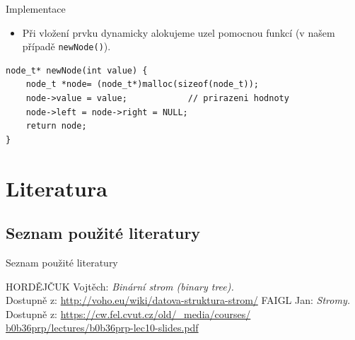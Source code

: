 \documentclass[hyperref={unicode}]{beamer}
\begin{document}
\begin{frame}[fragile]{Implementace}
\begin{itemize}
    \item Při vložení prvku dynamicky alokujeme uzel pomocnou funkcí
    (v našem případě \verb|newNode()|).
\end{itemize}

\vskip 0.5cm

\begin{lstlisting}
node_t* newNode(int value) {
    node_t *node= (node_t*)malloc(sizeof(node_t));
    node->value = value;            // prirazeni hodnoty
    node->left = node->right = NULL;
    return node; 
}
\end{lstlisting}

\end{frame}

\section{Literatura}

\subsection{Seznam použité literatury}

\begin{frame}{Seznam použité literatury}

\begin{thebibliography}{9}
 HORDĚJČUK Vojtěch: \emph{Binární strom (binary tree).}\\
Dostupně z: \href{http://voho.eu/wiki/datova-struktura-strom/}
{http://voho.eu/wiki/datova-struktura-strom/}
 FAIGL Jan: \emph{Stromy.}\\
Dostupně z: \href{https://cw.fel.cvut.cz/old/_media/courses/b0b36prp/lectures/b0b36prp-lec10-slides.pdf}
{https://cw.fel.cvut.cz/old/\_media/courses/\\
b0b36prp/lectures/b0b36prp-lec10-slides.pdf}
\end{thebibliography}
\end{frame}
\end{document}
